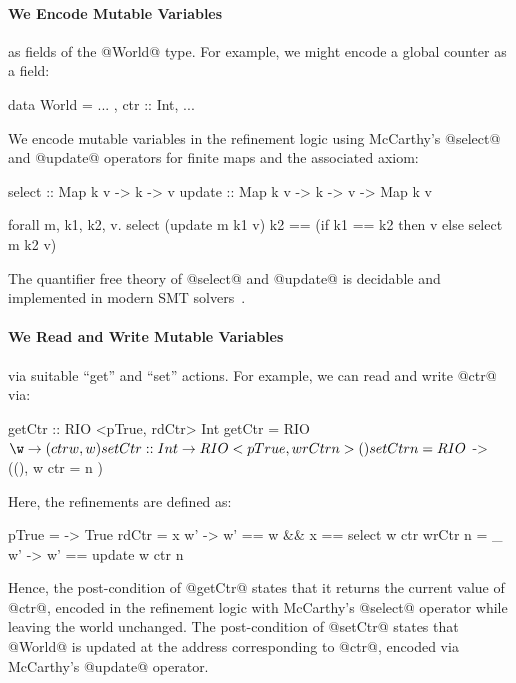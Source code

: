 \paragraph{We Encode Mutable Variables} as fields of 
the @World@ type. For example, we might encode
a global counter as a field:
%
\begin{code}
  data World = { ... , ctr :: Int, ... }
\end{code}
%
We encode mutable variables in the refinement logic
using McCarthy's @select@ and @update@ operators 
for finite maps and the associated axiom:
%
\begin{code}
  select :: Map k v -> k -> v
  update :: Map k v -> k -> v -> Map k v

  forall m, k1, k2, v.
       select (update m k1 v) k2
    == (if k1 == k2 then v else select m k2 v)
\end{code}
%
The quantifier free theory of @select@ and @update@ is decidable
and implemented in modern SMT solvers~\cite{SMTLIB2}.

%
\paragraph{We Read and Write Mutable Variables} via 
suitable ``get'' and ``set'' actions. For example,
we can read and write @ctr@ via:
%
\begin{code}
  getCtr   :: RIO <pTrue, rdCtr> Int
  getCtr   = RIO $ \w -> (ctr w, w)
    
  setCtr   :: Int -> RIO <pTrue, wrCtr n> ()
  setCtr n = RIO $ \w -> ((), w { ctr = n })
\end{code}
Here, the refinements are defined as:
%
\begin{code}
  pTrue = \w -> True
  rdCtr = \w x w' -> w' == w && x == select w ctr
  wrCtr n = \w _ w' -> w' == update w ctr n 
\end{code}
%
Hence, the post-condition of @getCtr@ states 
that it returns the current value of @ctr@, 
encoded in the refinement logic with McCarthy's 
@select@ operator while leaving the world unchanged.
%
The post-condition of @setCtr@ states that @World@
is updated at the address corresponding to @ctr@,
encoded via McCarthy's @update@ operator. 

